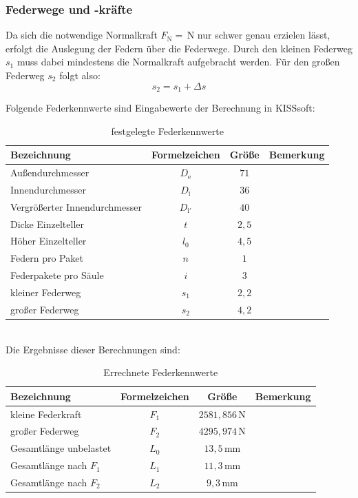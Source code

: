 \subsubsection{Federwege und -kräfte}
Da sich die notwendige Normalkraft $F_\mathrm{N} = \,\mathrm{N}$ nur schwer genau erzielen lässt, erfolgt die Auslegung der Federn über die Federwege. Durch den kleinen Federweg $s_1$ muss dabei mindestens die Normalkraft aufgebracht werden. Für den großen Federweg $s_2$ folgt also:
\begin{equation}
    s_2 = s_1 + \Delta s
\end{equation}

\noindent
Folgende Federkennwerte sind Eingabewerte der Berechnung in KISSsoft:  
\begin{table}[H]
    \centering
    \caption{festgelegte Federkennwerte}
    \begin{tabular}{p{8cm}ccc}
        \toprule
        Bezeichnung& Formelzeichen& Größe& Bemerkung \\
        \midrule
        Außendurchmesser& $D_\mathrm{e}$& $71$& \\
        Innendurchmesser& $D_\mathrm{i}$& $36$& \\
        Vergrößerter Innendurchmesser& $D_\mathrm{i'}$&  $40$& \\
        Dicke Einzelteller& $t$& $2,5$& \\
        Höher Einzelteller& $l_0$& $4,5$& \\
        Federn pro Paket& $n$& $1$& \\
        Federpakete pro Säule& $i$& $3$& \\
        \midrule
        kleiner Federweg& $s_1$& $2,2$& \\
        großer Federweg& $s_2$& $4,2$& \\
        \bottomrule
    \end{tabular}
    \label{KISSsoft Federn Eingabe}
\end{table}\\


\noindent
Die Ergebnisse dieser Berechnungen sind:
\begin{table}[H]
    \centering
    \caption{Errechnete Federkennwerte}
    \begin{tabular}{p{8cm}ccc}
        \toprule
        Bezeichnung&  Formelzeichen& Größe& Bemerkung\\
        \midrule
         kleine Federkraft& $F_1$& $2581,856\,\mathrm{N}$& \\
         großer Federweg& $F_2$& $4295,974\,\mathrm{N}$& \\
        \midrule
         Gesamtlänge unbelastet& $L_0$& $13,5\,\mathrm{mm}$& \\
         Gesamtlänge nach $F_1$& $L_1$& $11,3\,\mathrm{mm}$& \\
         Gesamtlänge nach $F_2$& $L_2$& $9,3\,\mathrm{mm}$& \\
        \bottomrule
    \end{tabular}
    \label{KISSsoft Federn Ausgabe}
\end{table}\\

